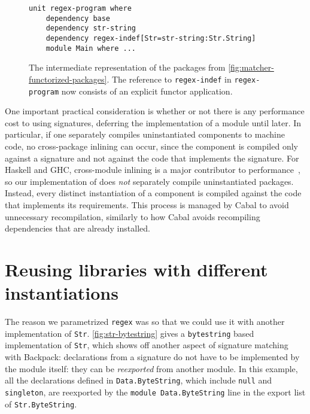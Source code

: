 \begin{figure}
\begin{lstlisting}
unit regex-program where
    dependency base
    dependency str-string
    dependency regex-indef[Str=str-string:Str.String]
    module Main where ...
\end{lstlisting}
\caption{The intermediate representation of the packages from \cref{fig:matcher-functorized-packages}.
The reference to \texttt{regex-indef} in \texttt{regex-program} now consists of an explicit functor application.}
\label{fig:matcher-bkp}
\end{figure}

One important practical consideration is whether or not there is any
performance cost to using signatures, deferring the implementation of
a module until later.  In particular, if one separately
compiles uninstantiated components to machine code, no cross-package
inlining can occur, since the component is compiled only against a
signature and not against the code that implements the signature.  For
Haskell and GHC, cross-module inlining is a major contributor to
performance~\cite{PeytonJones:2002:SGH:968417.968422}, so our implementation of \Backpack{} does \emph{not}
separately compile uninstantiated packages. Instead, every distinct
instantiation of a component is compiled against the code that
implements its requirements. This process is managed by Cabal to avoid
unnecessary recompilation, similarly to how Cabal avoids recompiling
dependencies that are already installed.

\section{Reusing libraries with different instantiations}

The reason we parametrized \verb|regex| was so that we could use it
with another implementation of \verb|Str|.  \cref{fig:str-bytestring}
gives a \verb|bytestring| based implementation of \verb|Str|, which shows
off another aspect of signature matching with Backpack: declarations from
a signature do not have to be implemented by the module itself: they can
be \emph{reexported} from another module.  In this example, all the declarations
defined in \verb|Data.ByteString|, which include \verb|null| and \verb|singleton|,
are reexported by the \verb|module Data.ByteString| line in the export list
of \verb|Str.ByteString|.

